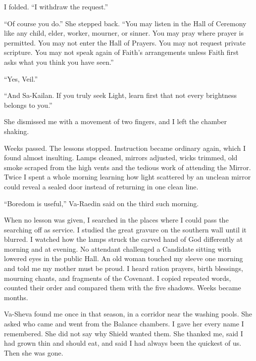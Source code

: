 I folded. ``I withdraw the request.''\par
``Of course you do.'' She stepped back. ``You may listen in the Hall of Ceremony like any child, elder, worker, mourner, or sinner. You may pray where prayer is permitted. You may not enter the Hall of Prayers. You may not request private scripture. You may not speak again of Faith's arrangements unless Faith first asks what you think you have seen.''\par
``Yes, Veil.''\par
``And Sa-Kailan. If you truly seek Light, learn first that not every brightness belongs to you.''\par

She dismissed me with a movement of two fingers, and I left the chamber shaking. \par

\ornament

Weeks passed. The lessons stopped. Instruction became ordinary again, which I found almost insulting. Lamps cleaned, mirrors adjusted, wicks trimmed, old smoke scraped from the high vents and the tedious work of attending the Mirror. Twice I spent a whole morning learning how light scattered by an unclean mirror could reveal a sealed door instead of returning in one clean line.\par

``Boredom is useful,'' Va-Raedin said on the third such morning.\par

When no lesson was given, I searched in the places where I could pass the searching off as service. I studied the great gravure on the southern wall until it blurred. I watched how the lamps struck the carved hand of God differently at morning and at evening. No attendant challenged a Candidate sitting with lowered eyes in the public Hall. An old woman touched my sleeve one morning and told me my mother must be proud. I heard ration prayers, birth blessings, mourning chants, and fragments of the Covenant. I copied repeated words, counted their order and compared them with the five shadows. Weeks became months.\par

Va-Sheva found me once in that season, in a corridor near the washing pools. She asked who came and went from the Balance chambers. I gave her every name I remembered. She did not say why Shield wanted them. She thanked me, said I had grown thin and should eat, and said I had always been the quickest of us. Then she was gone. \par

